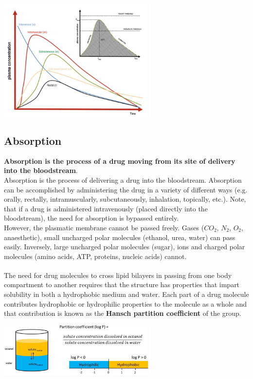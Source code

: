 \documentclass{book}
\begin{document}
\includegraphics[width=0.6\textwidth, center]{images/image2.png}


\subsection{Absorption}
\textbf{Absorption is the process of a drug moving from its site of delivery into the bloodstream}.
\\
Absorption is the process of delivering a drug into the bloodstream. 
Absorption can be accomplished by administering the drug in a variety of different ways (e.g. orally, rectally, intramuscularly, subcutaneously, inhalation, topically, etc.). 
Note, that if a drug is administered intravenously (placed directly into the bloodstream), the need for absorption is bypassed entirely.
\\
However, the plasmatic membrane cannot be passed freely.
Gases ($CO_2$, $N_2$, $O_2$, anaesthetic), small uncharged polar molecules (ethanol, urea, water) can pass easily. Inversely, large uncharged polar molecules (sugar), ions and charged polar molecules (amino acids, ATP, proteins, nucleic acids) cannot.
\\
\\
The need for drug molecules to cross lipid bilayers in passing from one body compartment to another requires that the structure has properties that impart solubility in both a hydrophobic medium and water. 
Each part of a drug molecule contributes hydrophobic or hydrophilic properties to the molecule as a whole and that contribution is known as the \textbf{Hansch partition coefficient} of the
group.

\includegraphics[width=0.6\textwidth, center]{images/image3.png}
\end{document}
